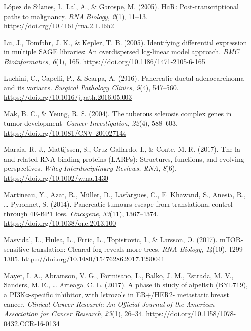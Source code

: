 \documentclass[12pt,openany]{book}
\begin{document}
\hypertarget{ref-LopezdeSilanes2005}{}
López de Silanes, I., Lal, A., \& Gorospe, M. (2005). HuR:
Post-transcriptional paths to malignancy. \emph{RNA Biology},
\emph{2}(1), 11--13. \url{https://doi.org/10.4161/rna.2.1.1552}

\hypertarget{ref-Lu2005}{}
Lu, J., Tomfohr, J. K., \& Kepler, T. B. (2005). Identifying
differential expression in multiple SAGE libraries: An overdispersed
log-linear model approach. \emph{BMC Bioinformatics}, \emph{6}(1), 165.
\url{https://doi.org/10.1186/1471-2105-6-165}

\hypertarget{ref-Luchini2016}{}
Luchini, C., Capelli, P., \& Scarpa, A. (2016). Pancreatic ductal
adenocarcinoma and its variants. \emph{Surgical Pathology Clinics},
\emph{9}(4), 547--560. \url{https://doi.org/10.1016/j.path.2016.05.003}

\hypertarget{ref-Mak2004}{}
Mak, B. C., \& Yeung, R. S. (2004). The tuberous sclerosis complex genes
in tumor development. \emph{Cancer Investigation}, \emph{22}(4),
588--603. \url{https://doi.org/10.1081/CNV-200027144}

\hypertarget{ref-Maraia2017}{}
Maraia, R. J., Mattijssen, S., Cruz-Gallardo, I., \& Conte, M. R.
(2017). The la and related RNA-binding proteins (LARPs): Structures,
functions, and evolving perspectives. \emph{Wiley Interdisciplinary
Reviews. RNA}, \emph{8}(6). \url{https://doi.org/10.1002/wrna.1430}

\hypertarget{ref-Martineau2014}{}
Martineau, Y., Azar, R., Müller, D., Lasfargues, C., El Khawand, S.,
Anesia, R., \ldots{} Pyronnet, S. (2014). Pancreatic tumours escape from
translational control through 4E-BP1 loss. \emph{Oncogene},
\emph{33}(11), 1367--1374. \url{https://doi.org/10.1038/onc.2013.100}

\hypertarget{ref-Masvidal2017}{}
Masvidal, L., Hulea, L., Furic, L., Topisirovic, I., \& Larsson, O.
(2017). mTOR-sensitive translation: Cleared fog reveals more trees.
\emph{RNA Biology}, \emph{14}(10), 1299--1305.
\url{https://doi.org/10.1080/15476286.2017.1290041}

\hypertarget{ref-Mayer2017}{}
Mayer, I. A., Abramson, V. G., Formisano, L., Balko, J. M., Estrada, M.
V., Sanders, M. E., \ldots{} Arteaga, C. L. (2017). A phase ib study of
alpelisib (BYL719), a PI3Kα-specific inhibitor, with letrozole in
ER+/HER2- metastatic breast cancer. \emph{Clinical Cancer Research: An
Official Journal of the American Association for Cancer Research},
\emph{23}(1), 26--34.
\url{https://doi.org/10.1158/1078-0432.CCR-16-0134}
\end{document}
